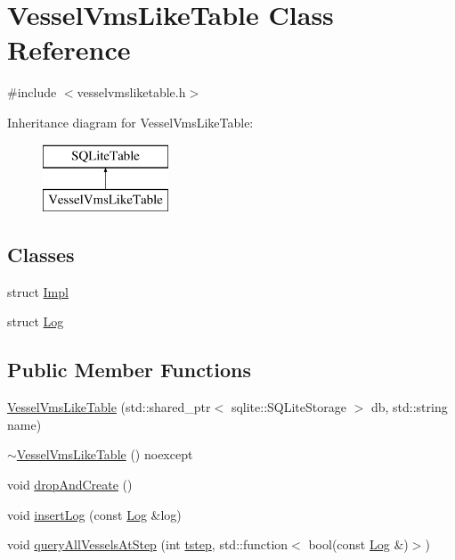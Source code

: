 \hypertarget{class_vessel_vms_like_table}{}\section{Vessel\+Vms\+Like\+Table Class Reference}
\label{class_vessel_vms_like_table}


{\ttfamily \#include $<$vesselvmsliketable.\+h$>$}

Inheritance diagram for Vessel\+Vms\+Like\+Table\+:\begin{figure}[H]
\begin{center}
\leavevmode
\includegraphics[height=2.000000cm]{dc/d34/class_vessel_vms_like_table}
\end{center}
\end{figure}
\subsection*{Classes}
\begin{DoxyCompactItemize}
\item 
struct \mbox{\hyperlink{struct_vessel_vms_like_table_1_1_impl}{Impl}}
\item 
struct \mbox{\hyperlink{struct_vessel_vms_like_table_1_1_log}{Log}}
\end{DoxyCompactItemize}
\subsection*{Public Member Functions}
\begin{DoxyCompactItemize}
\item 
\mbox{\hyperlink{class_vessel_vms_like_table_aebec4687c66172a5ba85319f4f51fb17}{Vessel\+Vms\+Like\+Table}} (std\+::shared\+\_\+ptr$<$ sqlite\+::\+S\+Q\+Lite\+Storage $>$ db, std\+::string name)
\item 
\mbox{\hyperlink{class_vessel_vms_like_table_abf78b3eccdad9fa3a4e0edd31fc00ae9}{$\sim$\+Vessel\+Vms\+Like\+Table}} () noexcept
\item 
void \mbox{\hyperlink{class_vessel_vms_like_table_ad4a64a0e314cb13e2efbe2678138550d}{drop\+And\+Create}} ()
\item 
void \mbox{\hyperlink{class_vessel_vms_like_table_a49a885a8638b3585e044e8d0bbcf2da1}{insert\+Log}} (const \mbox{\hyperlink{struct_vessel_vms_like_table_1_1_log}{Log}} \&log)
\item 
void \mbox{\hyperlink{class_vessel_vms_like_table_ad28eb28816146c416422a738b8b43fde}{query\+All\+Vessels\+At\+Step}} (int \mbox{\hyperlink{thread__vessels_8cpp_a84bc73d278de929ec9974e1a95d9b23a}{tstep}}, std\+::function$<$ bool(const \mbox{\hyperlink{struct_vessel_vms_like_table_1_1_log}{Log}} \&)$>$)
\end{DoxyCompactItemize}

